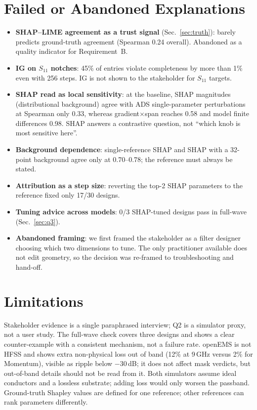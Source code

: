 \documentclass[conference,onecolumn,10pt]{IEEEtran}
\begin{document}
\section{Failed or Abandoned Explanations}
\begin{itemize}
\item \textbf{SHAP--LIME agreement as a trust signal} (Sec.~\ref{sec:truth}): barely predicts ground-truth agreement (Spearman 0.24 overall). Abandoned as a quality indicator for Requirement~B.
\item \textbf{IG on $S_{11}$ notches}: 45\% of entries violate completeness by more than 1\% even with 256 steps. IG is not shown to the stakeholder for $S_{11}$ targets.
\item \textbf{SHAP read as local sensitivity}: at the baseline, SHAP magnitudes (distributional background) agree with ADS single-parameter perturbations at Spearman only 0.33, whereas gradient$\times$span reaches 0.58 and model finite differences 0.98. SHAP answers a contrastive question, not ``which knob is most sensitive here''.
\item \textbf{Background dependence}: single-reference SHAP and SHAP with a 32-point background agree only at 0.70--0.78; the reference must always be stated.
\item \textbf{Attribution as a step size}: reverting the top-2 SHAP parameters to the reference fixed only 17/30 designs.
\item \textbf{Tuning advice across models}: 0/3 SHAP-tuned designs pass in full-wave (Sec.~\ref{sec:q3}).
\item \textbf{Abandoned framing}: we first framed the stakeholder as a filter designer choosing which two dimensions to tune. The only practitioner available does not edit geometry, so the decision was re-framed to troubleshooting and hand-off.
\end{itemize}

\section{Limitations}
Stakeholder evidence is a single paraphrased interview; Q2 is a simulator proxy, not a user study.
The full-wave check covers three designs and shows a clear counter-example with a consistent mechanism, not a failure rate.
openEMS is not HFSS and shows extra non-physical loss out of band (12\% at 9\,GHz versus 2\% for Momentum), visible as ripple below $-30$\,dB; it does not affect mask verdicts, but out-of-band details should not be read from it.
Both simulators assume ideal conductors and a lossless substrate; adding loss would only worsen the passband.
Ground-truth Shapley values are defined for one reference; other references can rank parameters differently.
\end{document}
